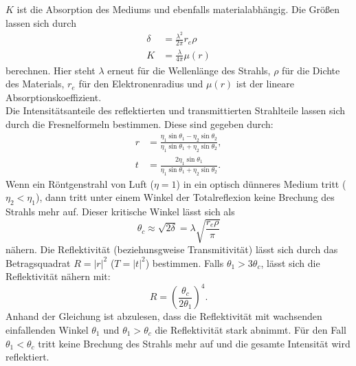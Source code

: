 $K$ ist die Absorption des Mediums und ebenfalls materialabhängig. Die Größen lassen sich durch
\begin{align}
    \delta &= \frac{\lambda^2}{2\pi}r_e\rho\\
    K &= \frac{\lambda}{4\pi}\mu(r)
\end{align}
berechnen. Hier steht $\lambda$ erneut für die Wellenlänge des Strahls, $\rho$ für die Dichte des Materials, $r_e$ für den Elektronenradius und $\mu(r)$ ist der lineare Absorptionskoeffizient.\\
Die Intensitätsanteile des reflektierten und transmittierten Strahlteile lassen sich durch die Fresnelformeln bestimmen. Diese sind gegeben durch:
\begin{align}
    r &= \frac{\eta_1 \sin{\theta_1} - \eta_2 \sin{\theta_2}}{\eta_1 \sin{\theta_1} + \eta_2 \sin{\theta_2}},\\
    t &= \frac{2\eta_1 \sin{\theta_1}}{\eta_1 \sin{\theta_1} + \eta_2 \sin{\theta_2}}.
\end{align}
Wenn ein Röntgenstrahl von Luft ($\eta = 1$) in ein optisch dünneres Medium tritt ($\eta_2 < \eta_1$), dann tritt unter einem Winkel der Totalreflexion
keine Brechung des Strahls mehr auf. Dieser kritische Winkel lässt sich als
\begin{equation}
    \label{eqn:theta_total}
    \theta_c \approx \sqrt{2\delta} = \lambda \sqrt{\frac{r_e \rho}{\pi}}
\end{equation}
nähern. 
Die Reflektivität (beziehunsgweise Transmitivität) lässt sich durch das Betragsquadrat $R = |r|^2$ ($T= |t|^2$) bestimmen. Falls $\theta_1 > 3 \theta_c$,
lässt sich die Reflektivität nähern mit:
\begin{equation}
    R = \left(\frac{\theta_c}{2\theta_1}\right)^4.
\end{equation}
Anhand der Gleichung ist abzulesen, dass die Reflektivität mit wachsenden einfallenden Winkel $\theta_1$ und $\theta_1 > \theta_c$ die Reflektivität stark abnimmt. Für den Fall
$\theta_1 < \theta_c$ tritt keine Brechung des Strahls mehr auf und die gesamte Intensität wird reflektiert.

